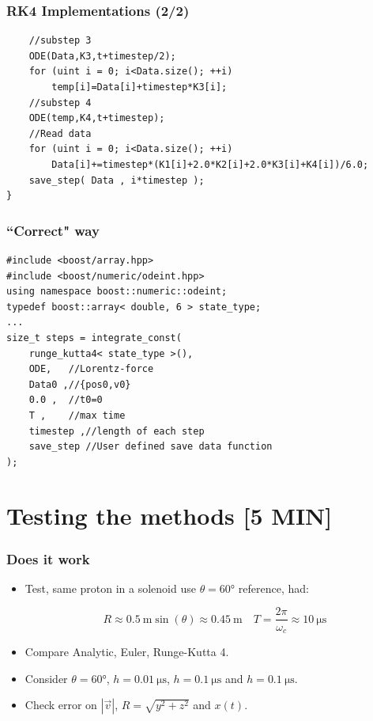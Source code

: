\documentclass{beamer}
\begin{document}
\begin{frame}[fragile]
\frametitle{RK4 Implementations (2/2)}
\begin{lstlisting}
    //substep 3
    ODE(Data,K3,t+timestep/2);
    for (uint i = 0; i<Data.size(); ++i)
        temp[i]=Data[i]+timestep*K3[i];
    //substep 4
    ODE(temp,K4,t+timestep);
    //Read data
    for (uint i = 0; i<Data.size(); ++i)
        Data[i]+=timestep*(K1[i]+2.0*K2[i]+2.0*K3[i]+K4[i])/6.0;
    save_step( Data , i*timestep );
}
\end{lstlisting}
\end{frame}


\begin{frame}[fragile]
\frametitle{``Correct" way}
\begin{lstlisting}
#include <boost/array.hpp>
#include <boost/numeric/odeint.hpp>
using namespace boost::numeric::odeint;
typedef boost::array< double, 6 > state_type;
...
size_t steps = integrate_const(
    runge_kutta4< state_type >(),
    ODE,   //Lorentz-force
    Data0 ,//{pos0,v0}
    0.0 ,  //t0=0
    T ,    //max time
    timestep ,//length of each step
    save_step //User defined save data function
);
\end{lstlisting}
\end{frame}



\section{Testing the methods [5 MIN]}

\begin{frame}
\frametitle{Does it work}
\begin{itemize}

\item<1-> Test, same proton in a solenoid use $\theta=\ang{60}$ reference, had:

\begin{equation*}
R \approx \SI{0.5}{\meter}\sin(\theta)\approx \SI{0.45}{\meter} \quad T=\frac{2\pi}{\omega_c} \approx \SI{10}{\micro\second}
\end{equation*}

\item<2-> Compare Analytic, Euler, Runge-Kutta 4.

\item<3-> Consider $\theta=\ang{60}$, $h=\SI{0.01}{\micro\second}$, $h=\SI{0.1}{\micro\second}$ and  $h=\SI{0.1}{\micro\second}$.

\item<4-> Check error on $|\vec{v}|$, $R=\sqrt{y^2+z^2}$ and $x(t)$.
\end{itemize}
\end{frame}
\end{document}
